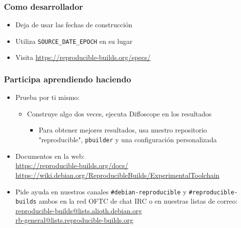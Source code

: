 \documentclass[14pt,aspectratio=169]{beamer}
\begin{document}
\begin{frame}
 \frametitle{Como desarrollador}
 \begin{itemize}
  \item Deja de usar las fechas de construcción
  \item Utiliza \texttt{SOURCE\_DATE\_EPOCH} en su lugar
  \item Visita \url{https://reproducible-builds.org/specs/}
 \end{itemize}
\end{frame}

\begin{frame}
 \frametitle{Participa aprendiendo haciendo}

 \begin{itemize}
  \item Prueba por ti mismo:
   \begin{itemize}
    \item Construye algo dos veces, ejecuta Diffoscope en los resultados
    \begin{itemize}
     \item Para obtener mejores resultados, usa nuestro repositorio "reproducible", \texttt{pbuilder} y una configuración personalizada
    \end{itemize}
   \end{itemize}
  \item Documentos en la web: \\
    \small{\url{https://reproducible-builds.org/docs/}} \\
    \small{\url{https://wiki.debian.org/ReproducibleBuilds/ExperimentalToolchain}}
  \item Pide ayuda en nuestros canales \texttt{\#debian-reproducible} y \texttt{\#reproducible-builds} ambos en la red OFTC de chat IRC o en nuestras listas de correo: \\
    \small{\url{reproducible-builds@lists.alioth.debian.org}} \\
    \small{\url{rb-general@lists.reproducible-builds.org}} 
 \end{itemize}
\end{frame}
\end{document}
